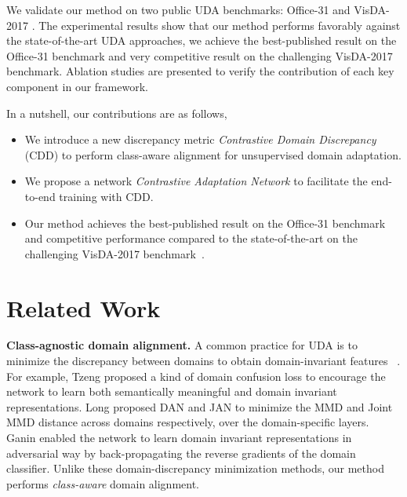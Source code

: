 \documentclass[10pt,twocolumn,letterpaper]{article}
\begin{document}
We validate our method on two public UDA benchmarks: 
Office-31 \cite{saenko2010adapting} and VisDA-2017 \cite{peng2017visda}. 
The experimental results show that our method performs favorably against the state-of-the-art UDA approaches, \ie we achieve the best-published result on the Office-31 benchmark and very competitive result on the challenging VisDA-2017 benchmark. Ablation studies are presented to verify the contribution of each key component in our framework.

In a nutshell, our contributions are as follows, 
\begin{itemize}
\item We introduce a new discrepancy metric \textit{Contrastive Domain Discrepancy} (CDD) to perform class-aware alignment for unsupervised domain adaptation.
\item We propose a network \textit{Contrastive Adaptation Network} to facilitate the end-to-end training with CDD.
\item Our method achieves the best-published result on the Office-31 benchmark~\cite{saenko2010adapting} and competitive performance 
compared to the state-of-the-art on the challenging VisDA-2017 benchmark~\cite{peng2017visda}.
\end{itemize}




















 
\section{Related Work} \label{sec:related-work}





\noindent\textbf{Class-agnostic domain alignment.}
A common practice for UDA is to minimize the discrepancy between domains 
to obtain domain-invariant features ~\cite{ganin2014unsupervised,bousmalis2016domain,long2017deep,long2015learning,long2016unsupervised,sun2016deep,kang2018deep}. 
For example, Tzeng \etal \cite{tzeng2014deep} proposed a kind of domain confusion loss to encourage the network to learn both semantically meaningful and domain invariant representations. Long \etal  proposed DAN \cite{long2015learning} and JAN \cite{long2017deep} to minimize the MMD and Joint MMD distance across domains respectively, over the domain-specific layers.
Ganin \etal \cite{ganin2014unsupervised} enabled the network to learn domain invariant representations in adversarial way by 
back-propagating the reverse gradients of the domain classifier. 
Unlike these domain-discrepancy minimization methods, our method performs  \emph{class-aware} domain alignment.
\end{document}
